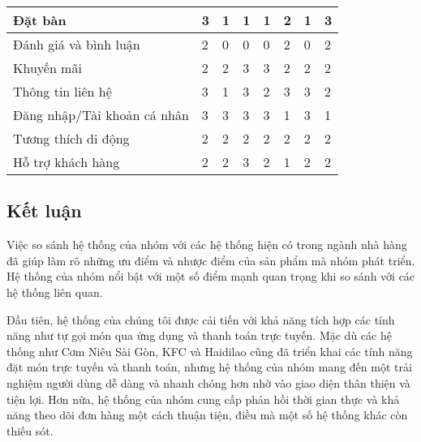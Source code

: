 \begin{longtable}{|p{2cm}|p{1.5cm}|p{1.5cm}|p{1.5cm}|p{1.5cm}|p{1.5cm}|p{1.5cm}|p{1.5cm}|}
	\hline
	Đặt bàn                     & 3                           & 1               & 1            & 1                 & 2                  & 1                         & 3                     \\
	\hline
	Đánh giá và bình luận       & 2                           & 0               & 0            & 0                 & 2                  & 0                         & 2                     \\
	\hline
	Khuyến mãi                  & 2                           & 2               & 3            & 3                 & 2                  & 2                         & 2                     \\
	\hline
	Thông tin liên hệ           & 3                           & 1               & 3            & 2                 & 3                  & 3                         & 2                     \\
	\hline
	Đăng nhập/Tài khoản cá nhân & 3                           & 3               & 3            & 3                 & 1                  & 3                         & 1                     \\
	\hline
	Tương thích di động         & 2                           & 2               & 2            & 2                 & 2                  & 2                         & 2                     \\
	\hline
	Hỗ trợ khách hàng           & 2                           & 2               & 3            & 2                 & 1                  & 2                         & 2                     \\
	\hline
\end{longtable}

\subsection{Kết luận}
Việc so sánh hệ thống của nhóm với các hệ thống hiện có trong ngành nhà hàng đã giúp làm rõ những ưu điểm và nhược điểm của sản phẩm mà nhóm phát triển. Hệ thống của nhóm nổi bật với một số điểm mạnh quan trọng khi so sánh với các hệ thống liên quan.

Đầu tiên, hệ thống của chúng tôi được cải tiến với khả năng tích hợp các tính năng như tự gọi món qua ứng dụng và thanh toán trực tuyến. Mặc dù các hệ thống như Cơm Niêu Sài Gòn, KFC và Haidilao cũng đã triển khai các tính năng đặt món trực tuyến và thanh toán, nhưng hệ thống của nhóm mang đến một trải nghiệm người dùng dễ dàng và nhanh chóng hơn nhờ vào giao diện thân thiện và tiện lợi. Hơn nữa, hệ thống của nhóm cung cấp phản hồi thời gian thực và khả năng theo dõi đơn hàng một cách thuận tiện, điều mà một số hệ thống khác còn thiếu sót.

